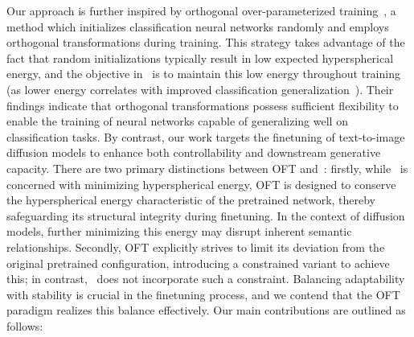 Our approach is further inspired by orthogonal over-parameterized training~\cite{liu2021orthogonal}, a method which initializes classification neural networks randomly and employs orthogonal transformations during training. This strategy takes advantage of the fact that random initializations typically result in low expected hyperspherical energy, and the objective in~\cite{liu2021orthogonal} is to maintain this low energy throughout training (as lower energy correlates with improved classification generalization~\cite{liu2018learning,lin2020regularizing}). Their findings indicate that orthogonal transformations possess sufficient flexibility to enable the training of neural networks capable of generalizing well on classification tasks. By contrast, our work targets the finetuning of text-to-image diffusion models to enhance both controllability and downstream generative capacity. There are two primary distinctions between OFT and~\cite{liu2021orthogonal}: firstly, while~\cite{liu2021orthogonal} is concerned with minimizing hyperspherical energy, OFT is designed to conserve the hyperspherical energy characteristic of the pretrained network, thereby safeguarding its structural integrity during finetuning. In the context of diffusion models, further minimizing this energy may disrupt inherent semantic relationships. Secondly, OFT explicitly strives to limit its deviation from the original pretrained configuration, introducing a constrained variant to achieve this; in contrast,~\cite{liu2021orthogonal} does not incorporate such a constraint. Balancing adaptability with stability is crucial in the finetuning process, and we contend that the OFT paradigm realizes this balance effectively. Our main contributions are outlined as follows:

